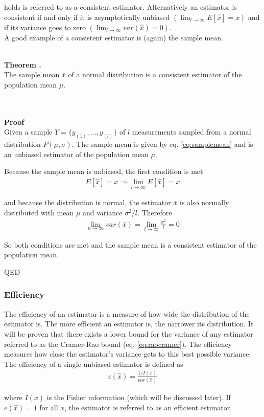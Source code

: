 \documentclass[report,12pt]{report}
\newcounter{theorem}
\newcounter{chpt}
\newcommand{\theorem}[2]
	{
		\hfill\\
		\textbf{Theorem \arabic{chpt}.\arabic{theorem}}\\
		#1
		\hfill\\
		\hfill\\
		\textbf{Proof}\\
		#2
		\begin{flushright}QED\end{flushright}
		\stepcounter{theorem}
}
\begin{document}
holds is referred to as a consistent estimator. Alternatively an estimator is consistent if and only if it is asymptotically unbiased $(\lim_{l\to\infty} E[\hat x] = x)$ and if its variance goes to zero $(\lim_{l\to\infty} var(\hat x) = 0)$.\\
A good example of a consistent estimator is (again) the sample mean.

\theorem
{
The sample mean $\bar x$ of a normal distribution is a consistent estimator of the population mean $\mu$.
}
{
Given a sample $Y = \{y_{(1)}, ..., y_{(l)}\}$ of $l$ measurements sampled from a normal distribution $P(\mu, \sigma)$. The sample mean is given by eq. \ref{eq:samplemean} and is an unbiased estimator of the population mean $\mu$.

Because the sample mean is unbiased, the first condition is met
\begin{align}
	E[\hat x] = x \Rightarrow \lim_{l\to\infty} E[\hat x] = x
\end{align}

and because the distribution is normal, the estimator $\bar x$ is also normally distributed with mean $\mu$ and variance $\sigma^2/l$. Therefore
\begin{align}
	\lim_{n\to\infty} var(\bar x) = \lim_{l\to\infty} \frac{\sigma^2}{l} = 0
\end{align}

So both conditions are met and the sample mean is a consistent estimator of the population mean.
}




\subsubsection*{Efficiency}
The efficiency of an estimator is a measure of how wide the distribution of the estimator is. The more efficient an estimator is, the narrower its distribution. It will be proven that there exists a lower bound for the variance of any estimator referred to as the Cramer-Rao bound (eq. \ref{eq:raocramer}). The efficiency measures how close the estimator's variance gets to this best possible variance. The efficiency of a single unbiased estimator is defined as
\begin{align}
	\epsilon(\hat x) = \frac{1/I(x)}{var(\hat x)}
	\label{eq:efficiency}
\end{align}

where $I(x)$ is the Fisher information (which will be discussed later).  If $e(\hat x) = 1$ for all $x$, the estimator is referred to as an efficient estimator.\\
\end{document}
